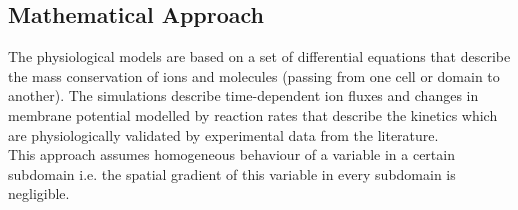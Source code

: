 %
%
% 
% 
%


\subsection{Mathematical Approach}
The physiological models are based on a set of differential equations that describe the mass conservation of ions and molecules (passing from one cell or domain to another). The simulations describe time-dependent ion fluxes and changes in membrane potential modelled by reaction rates that describe the kinetics which are physiologically validated by experimental data from the literature. \\
This approach assumes homogeneous behaviour of a variable in a certain subdomain i.e. the spatial gradient of this variable in every subdomain is negligible.

 



